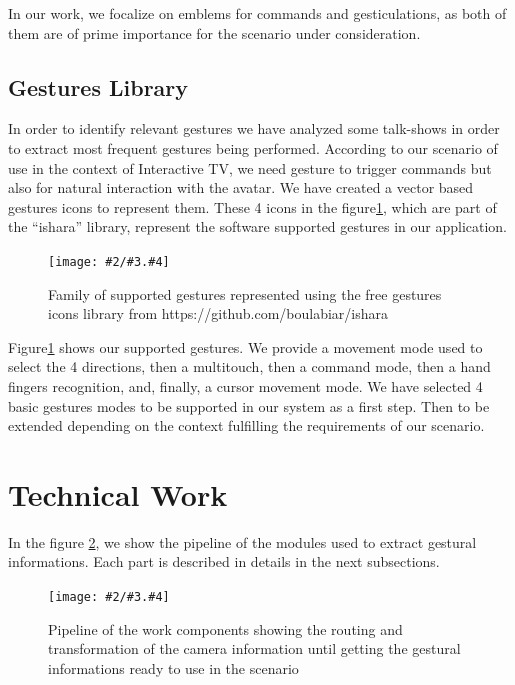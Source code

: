 \documentclass{llncs}
\newcommand{\imagepathext}[5]{%
\begin{figure}[!htbp]
\hfil\texttt{[image: \#2/\#3.\#4]}\hfil
\caption{#5\label{#3}}
\end{figure}}
\newcommand{\png}[2]{\imagepathext{width=\columnwidth}{pics}{#1}{png}{#2}}
\begin{document}
In our work, we focalize on emblems for commands and gesticulations, as both of
them are of prime importance for the scenario under consideration.

\subsection{Gestures Library}

In order to identify relevant gestures we have analyzed some talk-shows in order
to extract most frequent gestures being performed.
According to our scenario of use in the context of Interactive TV, we need
gesture to trigger commands but also for natural interaction with the avatar.
We have created a vector based gestures icons to represent them.
These 4 icons in the figure\ref{handg}, which are part of the ``ishara'' library,
represent the software supported gestures in our application.

\png{handg}{Family of supported gestures represented using the free gestures icons library from https://github.com/boulabiar/ishara }

Figure\ref{handg} shows our supported gestures. We provide a movement mode
used to select the 4 directions, then a multitouch, then a command mode, then a hand fingers recognition,
and, finally, a cursor movement mode.
We have selected 4 basic gestures modes to be supported in our system as a first step.
Then to be extended depending on the context fulfilling the requirements
of our scenario.

\section{Technical Work}

In the figure \ref{pipeline}, we show the pipeline of the modules used to
extract gestural informations. Each part is described in details in the next
subsections.

\png{pipeline}{Pipeline of the work components showing the routing and
transformation of the camera information until getting the gestural informations
ready to use in the scenario}
\end{document}
